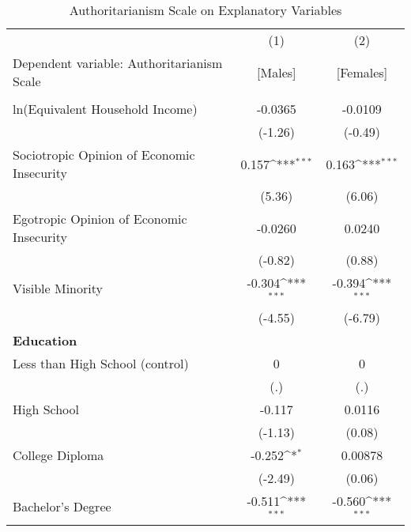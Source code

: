 \documentclass[11pt]{article}
\begin{document}
{
\begin{table}[ht]
\caption{Authoritarianism Scale on Explanatory Variables}
\centering
\def\sym#1{\ifmmode^{#1}\else\(^{#1}\)\fi}
\begin{tabular}{l*{2}{c}}
\hline\hline
            &\multicolumn{1}{c}{(1)}&\multicolumn{1}{c}{(2)}\\
            Dependent variable: Authoritarianism Scale &\multicolumn{1}{c}{[Males]}&\multicolumn{1}{c}{[Females]}\\
\hline 
\\
ln(Equivalent Household Income)&     -0.0365         &     -0.0109         \\
            &     (-1.26)         &     (-0.49)         \\
[1em]
Sociotropic Opinion of Economic Insecurity &       0.157\sym{***}&       0.163\sym{***}\\
            &      (5.36)         &      (6.06)         \\
[1em]
Egotropic Opinion of Economic Insecurity   &     -0.0260         &      0.0240       \\
            &     (-0.82)         &      (0.88)         \\
[1em]
Visible Minority&      -0.304\sym{***}&      -0.394\sym{***}\\
            &     (-4.55)         &     (-6.79)         \\
[1em]
\textbf{Education}            &                  &                 \\            
[1em]
\hspace{\parindent} \hspace{\parindent} Less than High School (control)      &           0         &           0         \\
            &         (.)         &         (.)         \\
[1em]
\hspace{\parindent} \hspace{\parindent} High School      &      -0.117         &      0.0116         \\
            &     (-1.13)         &      (0.08)         \\
[1em]
\hspace{\parindent} \hspace{\parindent} College Diploma      &      -0.252\sym{*}  &     0.00878         \\
            &     (-2.49)         &      (0.06)         \\
[1em]
\hspace{\parindent} \hspace{\parindent}  Bachelor's Degree      &      -0.511\sym{***}&      -0.560\sym{***}\\

\end{tabular}
\end{table}}
\end{document}
